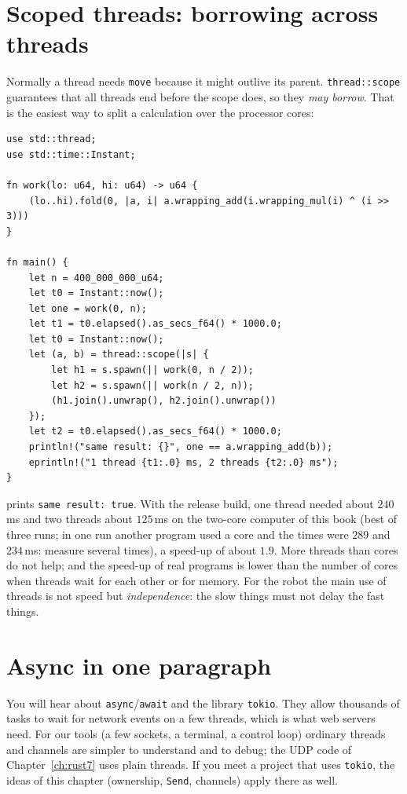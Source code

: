\section*{Scoped threads: borrowing across threads}
Normally a thread needs \verb!move! because it might outlive its parent. \verb!thread::scope! guarantees that all threads end before the scope does, so they \emph{may borrow}. That is the easiest way to split a calculation over the processor cores:
\begin{verbatim}
use std::thread;
use std::time::Instant;

fn work(lo: u64, hi: u64) -> u64 {
    (lo..hi).fold(0, |a, i| a.wrapping_add(i.wrapping_mul(i) ^ (i >> 3)))
}

fn main() {
    let n = 400_000_000_u64;
    let t0 = Instant::now();
    let one = work(0, n);
    let t1 = t0.elapsed().as_secs_f64() * 1000.0;
    let t0 = Instant::now();
    let (a, b) = thread::scope(|s| {
        let h1 = s.spawn(|| work(0, n / 2));
        let h2 = s.spawn(|| work(n / 2, n));
        (h1.join().unwrap(), h2.join().unwrap())
    });
    let t2 = t0.elapsed().as_secs_f64() * 1000.0;
    println!("same result: {}", one == a.wrapping_add(b));
    eprintln!("1 thread {t1:.0} ms, 2 threads {t2:.0} ms");
}
\end{verbatim}
prints \verb!same result: true!. With the release build, one thread needed about $240$\,ms and two threads about $125$\,ms on the two-core computer of this book (best of three runs; in one run another program used a core and the times were $289$ and $234$\,ms: measure several times), a speed-up of about $1.9$. More threads than cores do not help; and the speed-up of real programs is lower than the number of cores when threads wait for each other or for memory. For the robot the main use of threads is not speed but \emph{independence}: the slow things must not delay the fast things.

\section*{Async in one paragraph}
You will hear about \verb!async!/\verb!await! and the library \verb!tokio!. They allow thousands of tasks to wait for network events on a few threads, which is what web servers need. For our tools (a few sockets, a terminal, a control loop) ordinary threads and channels are simpler to understand and to debug; the UDP code of Chapter~\ref{ch:rust7} uses plain threads. If you meet a project that uses \verb!tokio!, the ideas of this chapter (ownership, \verb!Send!, channels) apply there as well.

